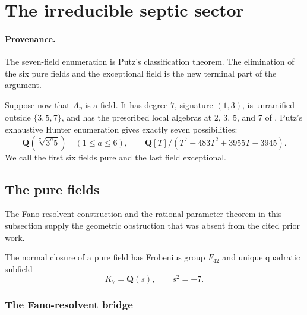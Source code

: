 \documentclass[11pt]{article}
\newcommand{\Q}{\mathbf Q}
\theoremstyle{definition}
\theoremstyle{remark}
\begin{document}
\section{The irreducible septic sector}\label{sec:irreducible}

\paragraph{Provenance.}
The seven-field enumeration is Putz's classification theorem.  The elimination of
the six pure fields and the exceptional field is the new terminal part of the
argument.

Suppose now that $A_\eta$ is a field.  It has degree $7$, signature
$(1,3)$, is unramified outside $\{3,5,7\}$, and has the prescribed
local algebras at $2$, $3$, $5$, and $7$ of
\cite[Corollary~3.4 and Propositions~3.5--3.7]{DahmenSiksek}.
Putz's exhaustive Hunter enumeration
\cite[Theorem~3.50]{Putz} gives exactly seven possibilities:
\begin{equation}\label{eq:seven-fields}
 \Q\!\left(\sqrt[7]{3^a5}\right)\quad(1\leq a\leq6),
 \qquad
 \Q[T]/(T^7-483T^2+3955T-3945).
\end{equation}
We call the first six fields pure and the last field exceptional.

\subsection{The pure fields}

The Fano-resolvent construction and the rational-parameter theorem in this
subsection supply the geometric obstruction that was absent from the cited prior work.

The normal closure of a pure field has Frobenius group $F_{42}$ and unique
quadratic subfield
\[
                              K_7=\Q(s),\qquad s^2=-7.
\]

\subsubsection{The Fano-resolvent bridge}
\end{document}
